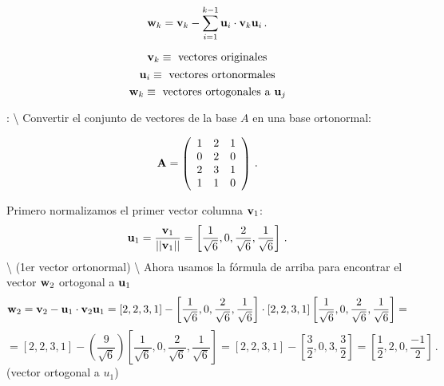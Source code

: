 \documentclass[
]{agujournal2019}
\begin{document}
\[{\textbf w}_k={\textbf v}_k-\sum\limits^{k-1}_{i=1} {\textbf u}_i\cdot{\textbf v}_k{\textbf u}_i\,.\]

\vspace{0.25cm}

\[{\textbf v}_k\equiv\,\,{\rm vectores}\,\,{\rm originales}\]
\[{\textbf u}_i\equiv\,\,{\rm vectores}\,\,{\rm ortonormales}\]
\[{\textbf w}_k\equiv\,\,{\rm vectores}\,\,{\rm ortogonales}\,\,{\rm a}\,\,{\textbf u}_j\]

\vspace{0.25cm}

: \textbackslash{} Convertir el conjunto de
vectores de la base \(A\) en una base ortonormal:

\[{\textbf A}=\left(\begin{array}{cccc}
  1 & 2 & 1\\
  0 & 2 & 0\\
  2 & 3 & 1\\
  1 & 1 & 0\\
\end{array}
  \right)
\,.\]

Primero normalizamos el primer vector columna \({\textbf v}_1\):
\[{\textbf u}_1=\frac{{\textbf v}_1}{||{\textbf v}_1||}=\left[\frac{1}{\sqrt{6}},0,\frac{2}{\sqrt{6}},\frac{1}{\sqrt{6}}\right]\,.\]
\textbackslash{} (1er vector ortonormal) \textbackslash{} Ahora usamos
la fórmula de arriba para encontrar el vector \({\textbf w}_2\)
ortogonal a \({\textbf u}_1\)
\[{\textbf w}_2={\textbf v}_2- {\textbf u}_1\cdot{\textbf v}_2{\textbf u}_1=[2,2,3,1]-
   \left[\frac{1}{\sqrt{6}},0,\frac{2}{\sqrt{6}},\frac{1}{\sqrt{6}}\right]\cdot
   [2,2,3,1]\left[\frac{1}{\sqrt{6}},0,\frac{2}{\sqrt{6}},\frac{1}{\sqrt{6}}\right]=\]
\[=[2,2,3,1]-\left(\frac{9}{\sqrt{6}}\right)\left[\frac{1}{\sqrt{6}},0,\frac{2}{\sqrt{6}},\frac{1}{\sqrt{6}}\right]=
   [2,2,3,1]-\left[\frac{3}{2},0,3,\frac{3}{2}\right]=\left[ \frac{1}{2},2,0,\frac{-1}{2}\right]\,.\]
(vector ortogonal a \(u_1\))
\end{document}
